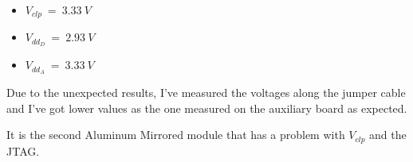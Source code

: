 \documentclass[a4papper, 10pt]{article}
\begin{document}
     
     \begin{itemize}
       \item $V_{clp} \ = \ 3.33 \ V$ 
       \item $V_{dd_D} \ = \ 2.93 \ V$
       \item $V_{dd_A} \ = \ 3.33 \ V$
     \end{itemize}
        
    Due to the unexpected results, I've measured the voltages along the jumper cable and I've got lower values as the one measured on the auxiliary board as expected.

    It is the second Aluminum Mirrored module that has a problem with $V_{clp}$ and the JTAG.

 
\end{document}
